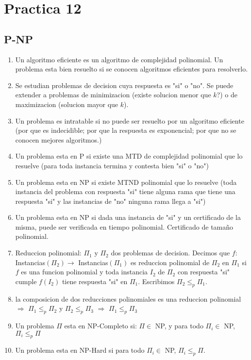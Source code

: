 \documentclass[a4paper, 11pt]{article}
\begin{document}
\section{Practica 12}
\subsection{P-NP}
\begin{enumerate}
\item Un algoritmo eficiente es un algoritmo de complejidad polinomial. Un problema esta bien resuelto si se conocen algoritmos eficientes para resolverlo.
\item Se estudian problemas de decision cuya respuesta es "si" o "no". Se puede extender a problemas de minimizacion (existe solucion menor que $k$?) o de maximizacion (solucion mayor que $k$).
\item Un problema es intratable si no puede ser resuelto por un algoritmo eficiente (por que es indecidible; por que la respuesta es exponencial; por que no se conocen mejores algoritmos.)
\item Un problema esta en P si existe una MTD de complejidad polinomial que lo resuelve (para toda instancia termina y contesta bien "si" o "no")
\item Un problema esta en NP si existe MTND polinomial que lo resuelve (toda instancia del problema con respuesta "si" tiene alguna rama que tiene una respuesta "si" y las instancias de "no" ninguna rama llega a "si")
\item Un problema esta en NP si dada una instancia de "si" y un certificado de la misma, puede ser verificada en tiempo polinomial. Certificado de tamaño polinomial.
\item Reduccion polinomial: $\Pi_{1}$ y $\Pi_{2}$ dos problemas de decision. Decimos que $f:$ Instancias$(\Pi_{2}) \rightarrow$ Instancias$(\Pi_{1})$ es reduccion polinomial de $\Pi_{2}$ en $\Pi_{1}$ si $f$ es una funcion polinomial y toda instancia $I_{2}$ de $\Pi_{2}$ con respuesta "si" cumple $f(I_{2})$ tiene respuesta "si" en $\Pi_{1}$. Escribimos $\Pi_{2} \leq_{p} \Pi_{1}$.
\item la composicion de dos reducciones polinomiales es una reduccion polinomial $\Rightarrow$ $\Pi_{1} \leq_{p} \Pi_{2}$ y $\Pi_{2} \leq_{p} \Pi_{3}$ $\Rightarrow$ $\Pi_{1} \leq_{p} \Pi_{3}$
\item Un problema $\Pi$ esta en NP-Completo si: $\Pi \in$ NP, y para todo $\Pi_{i} \in$ NP, $\Pi_{i} \leq_{p} \Pi$
\item Un problema esta en NP-Hard si para todo $\Pi_{i} \in$ NP, $\Pi_{i} \leq_{p} \Pi$.

\end{enumerate}
\end{document}
